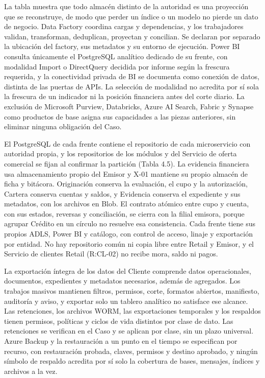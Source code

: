 \documentclass[11pt]{article}
\begin{document}
La tabla muestra que todo almacén distinto de la autoridad es una proyección que se reconstruye, de modo que perder un índice o un modelo no pierde un dato de negocio. Data Factory coordina cargas y dependencias, y los trabajadores validan, transforman, deduplican, proyectan y concilian. Se declaran por separado la ubicación del factory, sus metadatos y su entorno de ejecución. Power BI consulta únicamente el PostgreSQL analítico dedicado de su frente, con modalidad Import o DirectQuery decidida por informe según la frescura requerida, y la conectividad privada de BI se documenta como conexión de datos, distinta de las puertas de APIs. La selección de modalidad no acredita por sí sola la frescura de un indicador ni la posición financiera antes del corte diario. La exclusión de Microsoft Purview, Databricks, Azure AI Search, Fabric y Synapse como productos de base asigna sus capacidades a las piezas anteriores, sin eliminar ninguna obligación del Caso.

El PostgreSQL de cada frente contiene el repositorio de cada microservicio con autoridad propia, y los repositorios de los módulos y del Servicio de oferta comercial se fijan al confirmar la partición (Tabla 4.5). La evidencia financiera usa almacenamiento propio del Emisor y X-01 mantiene su propio almacén de ficha y bitácora. Originación conserva la evaluación, el cupo y la autorización, Cartera conserva cuentas y saldos, y Evidencia conserva el expediente y sus metadatos, con los archivos en Blob. El contrato atómico entre cupo y cuenta, con sus estados, reversas y conciliación, se cierra con la filial emisora, porque agrupar Crédito en un círculo no resuelve esa consistencia. Cada frente tiene sus propios ADLS, Power BI y catálogo, con control de acceso, linaje y exportación por entidad. No hay repositorio común ni copia libre entre Retail y Emisor, y el Servicio de clientes Retail (R:CL-02) no recibe mora, saldo ni pagos.

La exportación íntegra de los datos del Cliente comprende datos operacionales, documentos, expedientes y metadatos necesarios, además de agregados. Los trabajos masivos mantienen filtros, permisos, corte, formatos abiertos, manifiesto, auditoría y aviso, y exportar solo un tablero analítico no satisface ese alcance. Las retenciones, los archivos WORM, las exportaciones temporales y los respaldos tienen permisos, políticas y ciclos de vida distintos por clase de dato. Las retenciones se verifican en el Caso y se aplican por clase, sin un plazo universal. Azure Backup y la restauración a un punto en el tiempo se especifican por recurso, con restauración probada, claves, permisos y destino aprobado, y ningún símbolo de respaldo acredita por sí solo la cobertura de bases, mensajes, índices y archivos a la vez.
\end{document}
